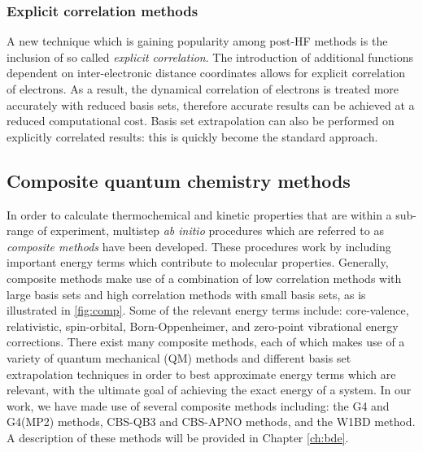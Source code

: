 \subsubsection{Explicit correlation methods}

A new technique which is gaining popularity among post-HF methods is the inclusion of so called \emph{explicit correlation}.\cite{Shiozaki2008,Kohn2008} The introduction of additional functions dependent on inter-electronic distance coordinates allows for explicit correlation of electrons.\cite{Tenno2012} As a result, the dynamical correlation of electrons is treated more accurately with reduced basis sets, therefore accurate results can be achieved at a reduced computational cost. Basis set extrapolation can also be performed on explicitly correlated results: this is quickly become the standard approach.\cite{Feller2013}


\subsection{Composite quantum chemistry methods}

In order to calculate thermochemical and kinetic properties that are within a sub-\kcalmol range of experiment, multistep \emph{ab initio} procedures which are referred to as \emph{composite methods} have been developed.\cite{Karton2016} These procedures work by including important energy terms which contribute to molecular properties. Generally, composite methods make use of a combination of low correlation methods with large basis sets and high correlation methods with small basis sets, as is illustrated in \ref{fig:comp}. Some of the relevant energy terms include: core-valence, relativistic, spin-orbital, Born-Oppenheimer, and zero-point vibrational energy corrections. There exist many composite methods, each of which makes use of a variety of quantum mechanical (QM) methods and different basis set extrapolation techniques in order to best approximate energy terms which are relevant, with the ultimate goal of achieving the exact energy of a system. In our work, we have made use of several composite methods including: the G4 and G4(MP2) methods,\cite{Curtiss2007,Curtiss2007a} CBS-QB3 and CBS-APNO methods,\cite{Montgomery1999,Montgomery2000,Ochterski1996} and the W1BD method.\cite{Barnes2009} A description of these methods will be provided in Chapter \ref{ch:bde}.

